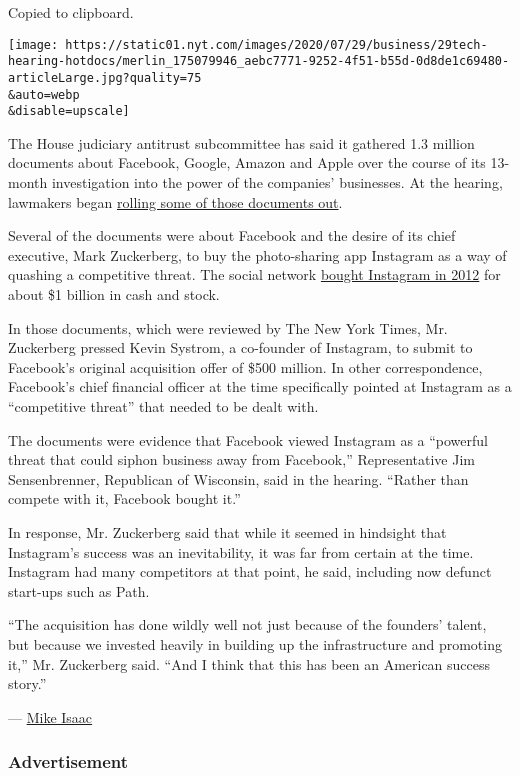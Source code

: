 Copied to clipboard.

\texttt{[image: https://static01.nyt.com/images/2020/07/29/business/29tech-hearing-hotdocs/merlin\_175079946\_aebc7771-9252-4f51-b55d-0d8de1c69480-articleLarge.jpg?quality=75\\\&auto=webp\\\&disable=upscale]}

The House judiciary antitrust subcommittee has said it gathered 1.3
million documents about Facebook, Google, Amazon and Apple over the
course of its 13-month investigation into the power of the companies'
businesses. At the hearing, lawmakers began
\href{https://twitter.com/HouseJudiciary/status/1288540745637474306?s=20}{rolling
some of those documents out}.

Several of the documents were about Facebook and the desire of its chief
executive, Mark Zuckerberg, to buy the photo-sharing app Instagram as a
way of quashing a competitive threat. The social network
\href{https://dealbook.nytimes.com/2012/04/09/facebook-buys-instagram-for-1-billion/\#:~:text=Facebook\%20is\%20not\%20waiting\%20for,stock\%2C\%20the\%20company\%20said\%20Monday.}{bought
Instagram in 2012} for about \$1 billion in cash and stock.

In those documents, which were reviewed by The New York Times, Mr.
Zuckerberg pressed Kevin Systrom, a co-founder of Instagram, to submit
to Facebook's original acquisition offer of \$500 million. In other
correspondence, Facebook's chief financial officer at the time
specifically pointed at Instagram as a ``competitive threat'' that
needed to be dealt with.

The documents were evidence that Facebook viewed Instagram as a
``powerful threat that could siphon business away from Facebook,''
Representative Jim Sensenbrenner, Republican of Wisconsin, said in the
hearing. ``Rather than compete with it, Facebook bought it.''

In response, Mr. Zuckerberg said that while it seemed in hindsight that
Instagram's success was an inevitability, it was far from certain at the
time. Instagram had many competitors at that point, he said, including
now defunct start-ups such as Path.

``The acquisition has done wildly well not just because of the founders'
talent, but because we invested heavily in building up the
infrastructure and promoting it,'' Mr. Zuckerberg said. ``And I think
that this has been an American success story.''

--- \href{https://www.nytimes.com/by/mike-isaac}{Mike Isaac}

\hypertarget{advertisement-1}{%
\subsubsection{Advertisement}\label{advertisement-1}}


